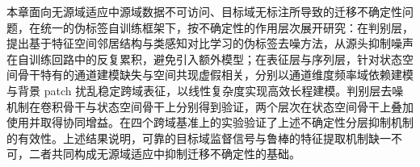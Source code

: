 本章面向无源域适应中源域数据不可访问、目标域无标注所导致的迁移不确定性问题，在统一的伪标签自训练框架下，按不确定性的作用层次展开研究：在判别层，提出基于特征空间邻居结构与类感知对比学习的伪标签去噪方法，从源头抑制噪声在自训练回路中的反复累积，避免引入额外模型；在表征层与序列层，针对状态空间骨干特有的通道建模缺失与空间共现虚假相关，分别以通道维度频率域依赖建模与背景 patch 扰乱稳定跨域表征，以线性复杂度实现高效长程建模。判别层去噪机制在卷积骨干与状态空间骨干上分别得到验证，两个层次在状态空间骨干上叠加使用并取得协同增益。在四个跨域基准上的实验验证了上述不确定性分层抑制机制的有效性。上述结果说明，可靠的目标域监督信号与鲁棒的特征提取机制缺一不可，二者共同构成无源域适应中抑制迁移不确定性的基础。

